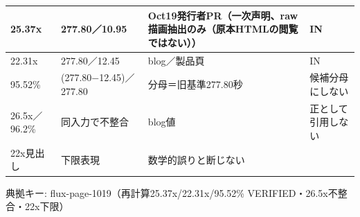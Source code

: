 \documentclass[lualatex,a4paper,10pt]{jlreq}
\begin{document}
{\centering\footnotesize
{}
\begin{tabularx}{0.96\linewidth}{@{}lXXX@{}}
\toprule
25.37x & 277.80／10.95 & Oct19発行者PR（一次声明、raw 描画抽出のみ（原本HTMLの閲覧ではない）） & IN \\
\midrule
22.31x & 277.80／12.45 & blog／製品頁 & IN \\
95.52\% & (277.80−12.45)／277.80 & 分母＝旧基準277.80秒 & 候補分母にしない \\
26.5x／96.2\% & 同入力で不整合 & blog値 & 正として引用しない \\
22x見出し & 下限表現 & 数学的誤りと断じない &  \\
\bottomrule
\end{tabularx}
{\scriptsize\color{SurveyMuted} 典拠キー: flux-page-1019（再計算25.37x/22.31x/95.52\% VERIFIED・26.5x不整合・22x下限）\par}
} %
\end{document}
